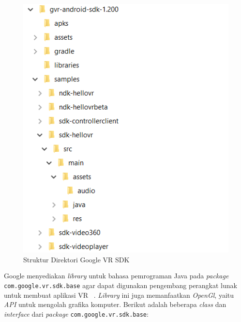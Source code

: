 \begin{figure}[h]
	\centering
		\includegraphics[scale=1.0]{Gambar/gvr_dir.png}
	\caption{Struktur Direktori Google VR SDK}
	\label{fig:gvr-dir}
\end{figure}

Google menyediakan \textit{library} untuk bahasa pemrograman Java pada \textit{package} \texttt{com.google.vr.sdk.base} agar dapat digunakan pengembang perangkat lunak untuk membuat aplikasi VR ~\cite{google-vr-sdk}. \textit{Library} ini juga memanfaatkan \textit{OpenGl}, yaitu \textit{API} untuk mengolah grafika komputer. Berikut adalah beberapa \textit{class} dan \textit{interface} dari \textit{package} \texttt{com.google.vr.sdk.base}:


